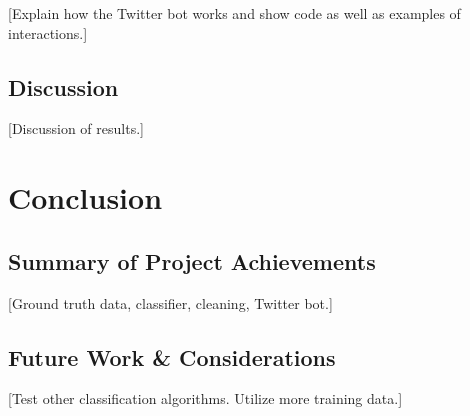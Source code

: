 \documentclass[11pt, twoside, reqno]{book}
\begin{document}
[Explain how the Twitter bot works and show code as well as examples of interactions.]

\section{Discussion}
\label{discussion}

[Discussion of results.]

\chapter{Conclusion}
\label{conclusion}

\section{Summary of Project Achievements}
\label{summary}

[Ground truth data, classifier, cleaning, Twitter bot.]

\section{Future Work \& Considerations}
\label{future_work_and_considerations}

[Test other classification algorithms. Utilize more training data.]
\end{document}
